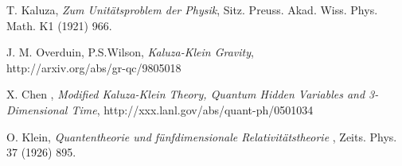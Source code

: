 \documentclass[twocolumn,showpacs,preprintnumbers,amsmath,amssymb]{revtex4}
\begin{document}
\begin{thebibliography}{9}

 T. Kaluza, {\it Zum Unit\"atsproblem der Physik},
                 Sitz. Preuss. Akad. Wiss. Phys. Math. K1 (1921) 966. 

  J. M. Overduin, P.S.Wilson, {\it Kaluza-Klein Gravity}, \\
		http://arxiv.org/abs/gr-qc/9805018
		
 X. Chen , {\it Modified Kaluza-Klein Theory, Quantum Hidden Variables and 3-Dimensional Time},
                http://xxx.lanl.gov/abs/quant-ph/0501034 		
		
 O. Klein, {\it Quantentheorie und f\"unfdimensionale 
                  Relativit\"atstheorie },
                  Zeits. Phys. 37 (1926) 895.                  		
                  
\end{thebibliography}
\end{document}
